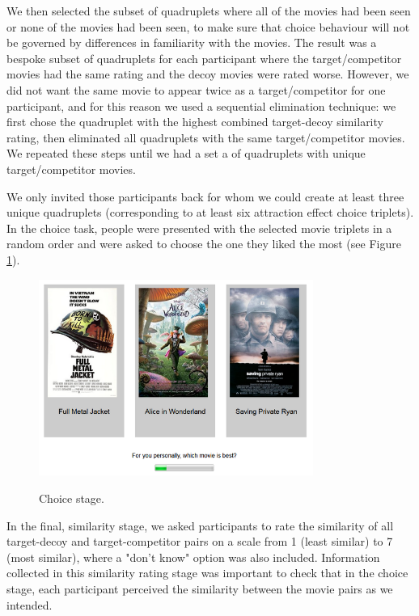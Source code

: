 \documentclass[12pt, a4paper]{article}
\begin{document}
We then selected the subset of quadruplets where all of the movies had been seen or none of the movies had been seen, to make sure that choice behaviour will not be governed by differences in familiarity with the movies. The result was a bespoke subset of quadruplets for each participant where the target/competitor movies had the same rating and the decoy movies were rated worse. However, we did not want the same movie to appear twice as a target/competitor for one participant, and for this reason we used a sequential elimination technique: we first chose the quadruplet with the highest combined target-decoy similarity rating, then eliminated all quadruplets with the same target/competitor movies. We repeated these steps until we had a set a of quadruplets with unique target/competitor movies.

We only invited those participants back for whom we could create at least three unique quadruplets (corresponding to at least six attraction effect choice triplets). In the choice task, people were presented with the selected movie triplets in a random order and were asked to choose the one they liked the most (see Figure \ref{fig:exp1_screenshot}).

\begin{figure}[htb!]
\centering
\captionsetup{justification=centering}
\caption{Choice stage.}
\includegraphics[width=0.8\textwidth]{rsz_exp1_choicestage.png}
\label{fig:exp1_screenshot}
\end{figure}

In the final, similarity stage, we asked participants to rate the similarity of all target-decoy and target-competitor pairs on a scale from 1 (least similar) to 7 (most similar), where a "don't know" option was also included. Information collected in this similarity rating stage was important to check that in the choice stage, each participant perceived the similarity between the movie pairs as we intended.
\end{document}
